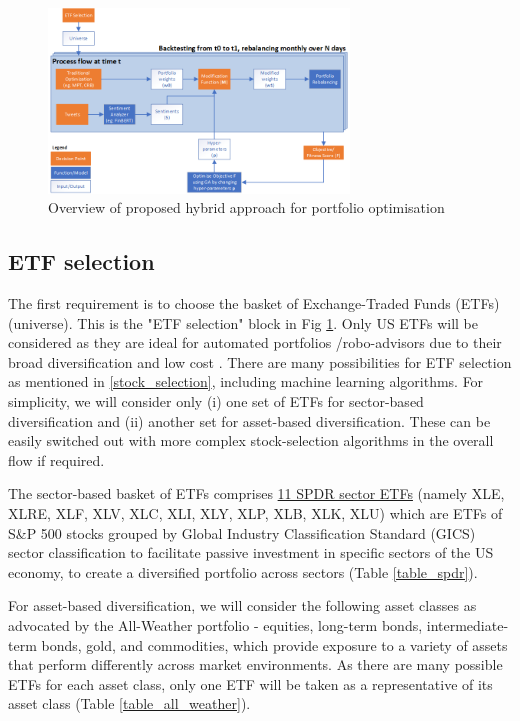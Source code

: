 \documentclass{article}
\begin{document}
\begin{figure}[tbh]
    \includegraphics[width=8cm]{figure_overall_architecture.png}
    \caption{Overview of proposed hybrid approach for portfolio optimisation \label{figure_overall}}
\end{figure}

\subsection{ETF selection}

The first requirement is to choose the basket of Exchange-Traded Funds (ETFs) (universe). This is the "ETF selection" block in  Fig \ref{figure_overall}. Only US ETFs will be considered as they are ideal for automated portfolios /robo-advisors due to their broad diversification and low cost \cite{etf2002}. There are many possibilities for ETF selection as mentioned in \ref{stock_selection}, including machine learning algorithms. For simplicity, we will consider only (i) one set of ETFs for sector-based diversification and (ii) another set for asset-based diversification. These can be easily switched out with more complex stock-selection algorithms in the overall flow if required.

The sector-based basket of ETFs comprises \href{http://www.sectorspdr.com/sectorspdr/}{11 SPDR sector ETFs} (namely XLE, XLRE, XLF, XLV, XLC, XLI, XLY, XLP, XLB, XLK, XLU) which are ETFs of S\&P 500 stocks grouped by Global Industry Classification Standard (GICS) sector classification to facilitate passive investment in specific sectors of the US economy, to create a diversified portfolio across sectors (Table \ref{table_spdr}).

For asset-based diversification, we will consider the following asset classes as advocated by the All-Weather portfolio - equities, long-term bonds, intermediate-term bonds, gold, and commodities, which provide exposure to a variety of assets that perform differently across market environments. As there are many possible ETFs for each asset class, only one ETF will be taken as a representative of its asset class (Table \ref{table_all_weather}).
\end{document}
